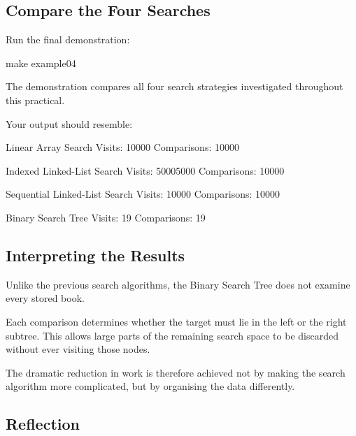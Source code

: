 \documentclass{csc2059practical}
\begin{document}
\subsection{Compare the Four Searches}

Run the final demonstration:

\begin{terminal}
make example04
\end{terminal}

The demonstration compares all four search strategies investigated throughout
this practical.

Your output should resemble:

\begin{terminal}
Linear Array Search
Visits: 10000
Comparisons: 10000

Indexed Linked-List Search
Visits: 50005000
Comparisons: 10000

Sequential Linked-List Search
Visits: 10000
Comparisons: 10000

Binary Search Tree
Visits: 19
Comparisons: 19
\end{terminal}


\subsection{Interpreting the Results}

Unlike the previous search algorithms, the Binary Search Tree does not examine
every stored book.

Each comparison determines whether the target must lie in the left or the right
subtree. This allows large parts of the remaining search space to be discarded
without ever visiting those nodes.

The dramatic reduction in work is therefore achieved not by making the search
algorithm more complicated, but by organising the data differently.



\subsection{Reflection}
\end{document}
